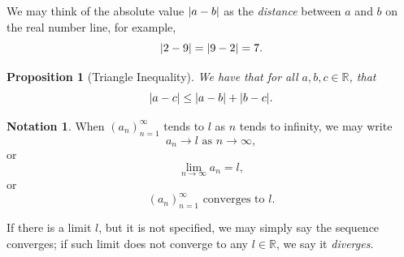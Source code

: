 \documentclass{article}
\newtheorem{proposition}[theorem]{Proposition}
\theoremstyle{definition}
\newtheorem{notation}[theorem]{Notation}
\theoremstyle{remark}
\DeclarePairedDelimiter{\abs}{\lvert}{\rvert}
\newcommand{\pqty}[1]{\left(#1\right)}
\newcommand{\RR}{\mathbb{R}}
\begin{document}
We may think of the absolute value \(\abs{a - b}\) as the \emph{distance} between \(a\) and \(b\) on the real number line, for example,
\[
    \abs{2 - 9} = \abs{9 - 2} = 7.
\]

\begin{proposition}[Triangle Inequality]
    We have that for all \(a, b, c \in \RR\), that
    \[
        \abs{a - c} \leq \abs{a - b} + \abs{b - c}.
    \]
\end{proposition}

\begin{notation}
    When \(\pqty{a_n}_{n = 1}^{\infty}\) tends to \(l\) as \(n\) tends to infinity, we may write
    \[
        a_n \to l \text{ as } n \to \infty,
    \]
    or
    \[
        \lim_{n \to \infty} a_n = l,
    \]
    or
    \[
        \pqty{a_n}_{n = 1}^{\infty} \text{ converges to } l.
    \]

    If there is a limit \(l\), but it is not specified, we may simply say the sequence converges; if such limit does not converge to any \(l \in \RR\), we say it \emph{diverges}.
\end{notation}
\end{document}
